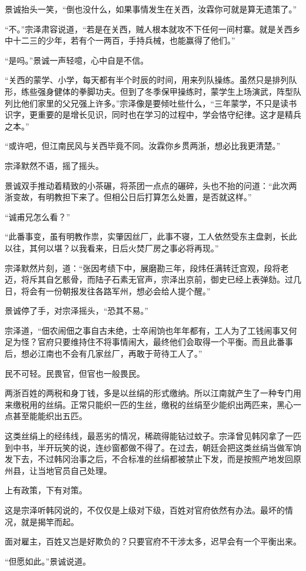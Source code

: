 景诚抬头一笑，“倒也没什么，如果事情发生在关西，汝霖你可就是算无遗策了。”

“不。”宗泽肃容说道，“若是在关西，贼人根本就攻不下任何一间村寨。就是关西乡中十二三的少年，若有个一两百，手持兵械，也能赢得了他们。”

“是吗。”景诚一声轻噫，心中自是不信。

“关西的蒙学、小学，每天都有半个时辰的时间，用来列队操练。虽然只是排列队形，练些强身健体的拳脚功夫。但到了冬季保甲操练时，蒙学生上场演武，阵型队列比他们家里的父兄强上许多。”宗泽像是要倾吐些什么，“三年蒙学，不只是读书识字，更重要的是增长见识，同时也在学习的过程中，学会恪守纪律。这才是精兵之本。”

“或许吧，但江南民风与关西毕竟不同。汝霖你乡贯两浙，想必比我更清楚。”

宗泽默然不语，摇了摇头。

景诚双手推动着精致的小茶碾，将茶团一点点的碾碎，头也不抬的问道：“此次两浙变故，有明教担下来了。但相公日后打算怎么处置，是否就这样。”

“诚甫兄怎么看？”

“此番事变，虽有明教作祟，实肇因丝厂，此事不寝，工人依然受东主盘剥，长此以往，其何以堪？以我看来，日后火焚厂房之事必将再现。”

宗泽默然片刻，道：“张因考绩下中，展磨勘三年，段炜任满转迁宫观，段将老迈，将斥其自乞骸骨，而陆子石素无官声，宗泽出京前，御史已经上表弹劾。过几日，将会有一份朝报发往各路军州，想必会给人提个醒。”

景诚停了手，对宗泽摇头，“恐其不易。”

宗泽道，“佃农闹佃之事自古未绝，士卒闹饷也年年都有，工人为了工钱闹事又何足为怪？官府只要维持住不将事情闹大，最终他们会取得一个平衡。而且此番事后，想必江南也不会有几家丝厂，再敢于苛待工人了。”

民不可轻。民畏官，但官也一般畏民。

两浙百姓的两税和身丁钱，多是以丝绢的形式缴纳。所以江南就产生了一种专门用来缴税用的丝绢。正常只能织一匹的生丝，缴税的丝绢至少能织出两匹来，黑心一点甚至能能织出五匹。

这类丝绢上的经纬线，最恶劣的情况，稀疏得能钻过蚊子。宗泽曾见韩冈拿了一匹到中书，半开玩笑的说，连纱窗都做不得了。在过去，朝廷会把这类丝绢当做军饷发下去，不过韩冈治事之后，不合标准的丝绢都被禁止下发，而是按照产地发回原州县，让当地官员自己处理。

上有政策，下有对策。

这是宗泽听韩冈说的，不仅仅是上级对下级，百姓对官府依然有办法。最坏的情况，就是揭竿而起。

面对雇主，百姓又岂是好欺负的？只要官府不干涉太多，迟早会有一个平衡出来。

“但愿如此。”景诚说道。
